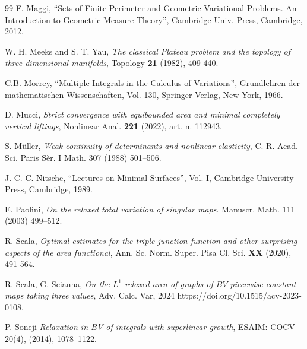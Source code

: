 \documentclass[a4paper,11pt]{article}
\numberwithin{equation}{section}
\begin{document}
\begin{thebibliography}{99}
 F. Maggi, 
``Sets of Finite Perimeter and Geometric Variational Problems.
An Introduction to Geometric Measure Theory'', 
Cambridge Univ. Press, Cambridge, 2012.

 W. H. Meeks and
S. T. Yau, \emph{The classical Plateau problem and the topology of three-dimensional manifolds}, Topology \textbf{21}
(1982), 409-440.

 C.B. Morrey,
``Multiple Integrals in the Calculus of Variations'', 
Grundlehren der mathematischen
Wissenschaften, Vol. 130, Springer-Verlag, New York, 1966.

 D. Mucci, \emph{Strict convergence with equibounded area and minimal completely vertical liftings}, Nonlinear Anal.
{\bf 221} (2022), art. n. 112943.

 S. M\"uller, \emph{Weak continuity of determinants and nonlinear elasticity}, C. R. Acad. Sci. Paris S\`er. I Math. 307 (1988) 501--506.

J. C. C. Nitsche, ``Lectures on Minimal Surfaces'', Vol. I,
Cambridge University Press, Cambridge, 1989.

E. Paolini, \emph{On the relaxed total variation of singular maps}. Manuscr. Math. 111 (2003) 499–512.

 R. Scala, \emph{Optimal estimates for the 
	triple junction function and other
	surprising aspects of the area functional}, { Ann. Sc. Norm. Super. Pisa Cl. Sci.} 
{\bf XX} (2020), 491-564.

 R. Scala, G. Scianna, \emph{On the $L^1$-relaxed area of graphs of
	$BV$ piecewise constant maps taking three values},  
Adv. Calc. Var, 2024 https://doi.org/10.1515/acv-2023-0108.



  P. Soneji \emph{Relaxation in BV of integrals with superlinear growth}, ESAIM: COCV  20(4), (2014), 1078--1122. 
\end{thebibliography}
\end{document}
